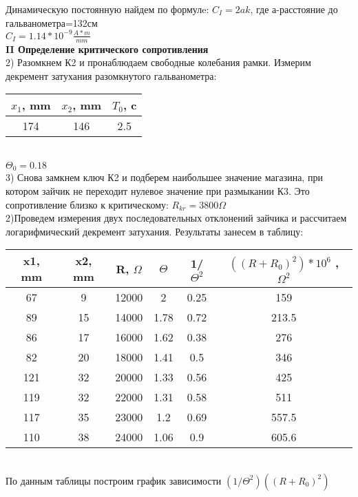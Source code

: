 \documentclass[a4paper,12pt]{article} %
\begin{document}
Динамическую постоянную найдем по формулe: $C_I=2ak$, где а-расстояние до гальванометра=132см\\
$C_I=1.14*10^{-9}\frac{A*m}{mm}$\\
\textbf{II Определение критического сопротивления}\\
2) Разомкнем К2 и пронаблюдаем свободные колебания рамки. Измерим  декремент затухания разомкнутого гальванометра:\begin{tabular}{|c|c|c|}
\hline 
$x_1$,  mm & $x_2$, mm & $T_0$, c \\ 
\hline 
174 & 146 & 2.5  \\ 
\hline 
\end{tabular} 
\\
$\Theta_0=0.18$\\
3) Снова замкнем ключ К2 и подберем наибольшее значение магазина, при котором зайчик не переходит нулевое значение при размыкании К3. Это сопротивление близко к критическому: $R_{kr}=3800 \Omega$\\
2)Проведем измерения  двух последовательных
отклонений зайчика и рассчитаем логарифмический декремент затухания. Результаты занесем в таблицу:\\
\begin{tabular}{|c|c|c|c|c|c|}
\hline 
x1, mm & x2, mm & R, $\Omega$ & $\Theta$ & 1/$\Theta^{2}$ & $((R+R_0)^2)*10^{6}$ , $\Omega^2$\\ 
\hline 
67 & 9 & 12000 & 2 & 0.25 & 159 \\ 
\hline 
89 & 15 & 14000 & 1.78 & 0.72 & 213.5 \\ 
\hline 
86 & 17 & 16000 & 1.62 & 0.38 & 276 \\ 
\hline 
82 & 20 & 18000 & 1.41 & 0.5 & 346 \\ 
\hline 
121 & 32 & 20000 & 1.33 & 0.56 & 425 \\ 
\hline 
119 & 32 & 22000 & 1.31 & 0.58 & 511 \\ 
\hline 
117 & 35 & 23000 & 1.2 & 0.69 & 557.5 \\ 
\hline 
110 & 38 & 24000 & 1.06 & 0.9 & 605.6 \\ 
\hline 

\end{tabular} 
\\


По данным таблицы построим график зависимости $(1/\Theta^{2})((R+R_0)^2)$ \\
\begin{flushleft}

\end{flushleft}
\end{document}
